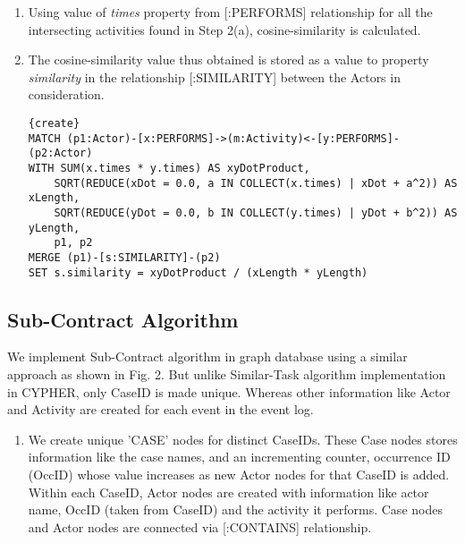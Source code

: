 \documentclass[11pt]{article}
\begin{document}
{{{\begin{enumerate}[nolistsep]
\begin{enumerate}
\item Using value of \textit{times} property from [:PERFORMS] relationship for all the intersecting activities found in Step 2(a), cosine-similarity is calculated. 
\item The cosine-similarity value thus obtained is stored as a value to property \textit{similarity} in the relationship [:SIMILARITY] between the Actors in consideration.
\lstset{language=SQL} 
\begin{lstlisting}{create}
MATCH (p1:Actor)-[x:PERFORMS]->(m:Activity)<-[y:PERFORMS]-(p2:Actor) 
WITH SUM(x.times * y.times) AS xyDotProduct, 
	SQRT(REDUCE(xDot = 0.0, a IN COLLECT(x.times) | xDot + a^2)) AS xLength, 
	SQRT(REDUCE(yDot = 0.0, b IN COLLECT(y.times) | yDot + b^2)) AS yLength, 
	p1, p2 
MERGE (p1)-[s:SIMILARITY]-(p2) 
SET s.similarity = xyDotProduct / (xLength * yLength)
\end{lstlisting}
\end{enumerate}
\end{enumerate}
}
\subsection{Sub-Contract Algorithm}
\par{We implement Sub-Contract algorithm in graph database using a similar approach as shown in Fig. 2. But unlike Similar-Task algorithm implementation in CYPHER, only CaseID is made unique. Whereas other information like Actor and Activity are created for each event in the event log.}
\par{\begin{enumerate}
\item We create unique 'CASE' nodes for distinct CaseIDs. These Case nodes stores information like the case names, and an incrementing counter, occurrence ID (OccID) whose value increases as new Actor nodes for that CaseID is added. Within each CaseID, Actor nodes are created with information like actor name, OccID (taken from CaseID) and the activity it performs. Case nodes and Actor nodes are connected via [:CONTAINS] relationship.


\end{enumerate}}}}
\end{document}

